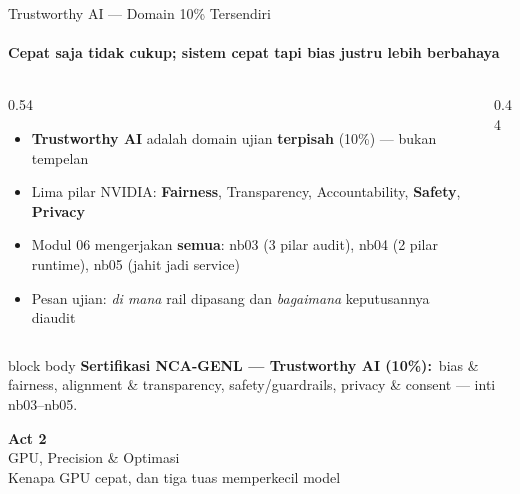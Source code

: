 \documentclass[aspectratio=169,t]{beamer}
\newcommand{\acttitle}[3]{%
  \begin{frame}[plain]
    \vspace{1.5cm}
    \begin{center}
      {\color{nvgreen}\Huge\bfseries Act #1}\\[1.2em]
      {\color{nvwhite}\Huge #2}\\[0.8em]
      {\color{nvgray}\Large #3}
    \end{center}
  \end{frame}%
}
\newcommand{\certnote}[2]{%
  \vspace{0.25em}
  \begin{beamercolorbox}[rounded=true,shadow=false,sep=5pt]{block body}
    {\scriptsize\color{nvblue}\textbf{Sertifikasi NCA-GENL --- #1:}}\,
    {\scriptsize\color{nvgray}#2}
  \end{beamercolorbox}%
}
\begin{document}
\begin{frame}{Trustworthy AI --- Domain 10\% Tersendiri}
  \framesubtitle{Cepat saja tidak cukup; sistem cepat tapi bias justru lebih berbahaya}
  \begin{columns}[T]
    \begin{column}{0.54\textwidth}
      \begin{itemize}\footnotesize
        \item \textbf{Trustworthy AI} adalah domain ujian \textbf{terpisah} (10\%) --- bukan tempelan
        \item Lima pilar NVIDIA: \textbf{Fairness}, Transparency, Accountability, \textbf{Safety}, \textbf{Privacy}
        \item Modul 06 mengerjakan \textbf{semua}: nb03 (3 pilar audit), nb04 (2 pilar runtime), nb05 (jahit jadi service)
        \item Pesan ujian: \emph{di mana} rail dipasang dan \emph{bagaimana} keputusannya diaudit
      \end{itemize}
    \end{column}
    \begin{column}{0.44\textwidth}
      \begin{center}
      \end{center}
    \end{column}
  \end{columns}
  \certnote{Trustworthy AI (10\%)}{bias \& fairness, alignment \& transparency, safety/guardrails, privacy \& consent --- inti nb03--nb05.}
\end{frame}

\acttitle{2}{GPU, Precision \& Optimasi}{Kenapa GPU cepat, dan tiga tuas memperkecil model}
\end{document}
